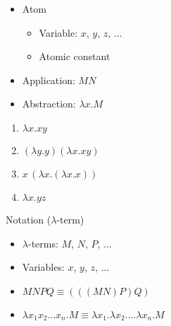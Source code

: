 \documentclass{beamer}
\begin{document}

\begin{frame}

  \begin{definition}
    \begin{itemize}
    \item
      Atom
      \begin{itemize}
      \item
        Variable: $x$, $y$, $z$, $\dots$
      \item
        Atomic constant
      \end{itemize}
    \item
      Application: $MN$
    \item
      Abstraction: $\lambda{x}.M$
    \end{itemize}
  \end{definition}
\end{frame}


\begin{frame}

  \begin{examples}
    \begin{enumerate}
    \item
      $\lambda{x}.xy$
    \item
      $(\lambda{y}.y)(\lambda{x}.xy)$
    \item
      $x\,(\lambda{x}.(\lambda{x}.x))$
    \item
      $\lambda{x}.yz$
    \end{enumerate}
  \end{examples}
\end{frame}


\begin{frame}

  \begin{block}{Notation ($\lambda$-term)}
    \begin{itemize}
    \item
      $\lambda$-terms: $M$, $N$, $P$, $\dots$
    \item
      Variables: $x$, $y$, $z$, $\dots$
    \end{itemize}
    \begin{itemize}
    \item
      $MNPQ \equiv (((MN)P)Q)$
    \item
      $\lambda{x_{1}x_{2}\dots x_{n}}.M \equiv
      \lambda{x_{1}}.\lambda{x_{2}}.\dots\lambda{x_{n}}.M$
    \end{itemize}
  \end{block}
\end{frame}
\end{document}
